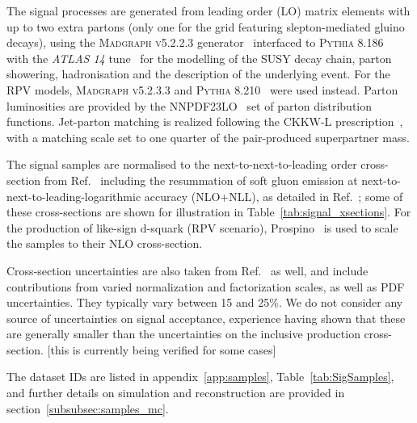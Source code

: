 The signal processes are generated from leading order (LO) matrix elements with up to two extra partons (only one for the grid featuring slepton-mediated gluino decays), 
using the \textsc{Madgraph v5.2.2.3} generator~\cite{Alwall:2014hca} interfaced to \textsc{Pythia} 8.186~\cite{Sjostrand:2007gs} 
with the \textit{ATLAS 14} tune~\cite{ATL-PHYS-PUB-2014-021} for the modelling of the SUSY decay chain, parton showering, 
hadronisation and the description of the underlying event. 
For the RPV models, \textsc{Madgraph v5.2.3.3} and \textsc{Pythia} 8.210~\cite{Sjostrand:2007gs} were used instead. 
Parton luminosities are provided by the \textsc{NNPDF23LO}~\cite{Carrazza:2013axa} set of parton distribution functions. 
Jet-parton matching is realized following the CKKW-L prescription~\cite{Lonnblad:2011xx}, 
with a matching scale set to one quarter of the pair-produced superpartner mass. 

The signal samples are normalised to the next-to-next-to-leading order cross-section from Ref.~\cite{twiki-SusyCrossSections} 
including the resummation of soft gluon emission at next-to-next-to-leading-logarithmic accuracy (NLO+NLL), 
as detailed in Ref.~\cite{Borschensky:2014cia}; 
some of these cross-sections are shown for illustration in Table~\ref{tab:signal_xsections}. 
For the production of like-sign d-squark (RPV scenario), 
Prospino~\cite{Beenakker:1996ed} is used to scale the samples to their NLO cross-section.

Cross-section uncertainties are also taken from Ref.~\cite{twiki-SusyCrossSections} as well, 
and include contributions from varied normalization and factorization scales, as well as PDF uncertainties. 
They typically vary between 15 and 25\%. 
We do not consider any source of uncertainties on signal acceptance, 
experience having shown that these are generally smaller than the uncertainties on the inclusive production cross-section. [this is currently being verified for some cases]

The dataset IDs are listed in appendix~\ref{app:samples}, Table~\ref{tab:SigSamples}, 
and further details on simulation and reconstruction are provided in section~\ref{subsubsec:samples_mc}. 
